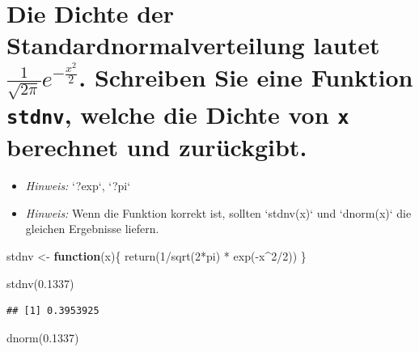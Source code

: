 \documentclass[12pt,a4paper]{article}
\newenvironment{Shaded}{\begin{snugshade}}{\end{snugshade}}
\newcommand{\ControlFlowTok}[1]{\textcolor[rgb]{0.13,0.29,0.53}{\textbf{#1}}}
\newcommand{\DecValTok}[1]{\textcolor[rgb]{0.00,0.00,0.81}{#1}}
\newcommand{\FloatTok}[1]{\textcolor[rgb]{0.00,0.00,0.81}{#1}}
\newcommand{\FunctionTok}[1]{\textcolor[rgb]{0.00,0.00,0.00}{#1}}
\newcommand{\NormalTok}[1]{#1}
\newcommand{\OtherTok}[1]{\textcolor[rgb]{0.56,0.35,0.01}{#1}}
\newcommand{\SpecialCharTok}[1]{\textcolor[rgb]{0.00,0.00,0.00}{#1}}
\begin{document}
\hypertarget{die-dichte-der-standardnormalverteilung-lautet-displaystyle-frac1sqrt2pi-e-fracx22.-schreiben-sie-eine-funktion-stdnv-welche-die-dichte-von-x-berechnet-und-zuruxfcckgibt.}{%
\section{\texorpdfstring{Die Dichte der Standardnormalverteilung lautet
\(\displaystyle \frac{1}{\sqrt{2\pi}} e^{-\frac{x^2}{2}}\). Schreiben
Sie eine Funktion \texttt{stdnv}, welche die Dichte von \texttt{x}
berechnet und
zurückgibt.}{Die Dichte der Standardnormalverteilung lautet \textbackslash displaystyle \textbackslash frac\{1\}\{\textbackslash sqrt\{2\textbackslash pi\}\} e\^{}\{-\textbackslash frac\{x\^{}2\}\{2\}\}. Schreiben Sie eine Funktion stdnv, welche die Dichte von x berechnet und zurückgibt.}}\label{die-dichte-der-standardnormalverteilung-lautet-displaystyle-frac1sqrt2pi-e-fracx22.-schreiben-sie-eine-funktion-stdnv-welche-die-dichte-von-x-berechnet-und-zuruxfcckgibt.}}

\begin{itemize}
  \item \textit{Hinweis:} `?exp`, `?pi`
  \item \textit{Hinweis:} Wenn die Funktion korrekt ist, sollten `stdnv(x)` und `dnorm(x)` die gleichen Ergebnisse liefern.
\end{itemize}

\begin{Shaded}
\begin{Highlighting}[]
\NormalTok{    stdnv }\OtherTok{\textless{}{-}} \ControlFlowTok{function}\NormalTok{(x)\{}
      \FunctionTok{return}\NormalTok{(}\DecValTok{1}\SpecialCharTok{/}\FunctionTok{sqrt}\NormalTok{(}\DecValTok{2}\SpecialCharTok{*}\NormalTok{pi) }\SpecialCharTok{*} \FunctionTok{exp}\NormalTok{(}\SpecialCharTok{{-}}\NormalTok{x}\SpecialCharTok{\^{}}\DecValTok{2}\SpecialCharTok{/}\DecValTok{2}\NormalTok{))}
\NormalTok{    \}}
    
    \FunctionTok{stdnv}\NormalTok{(}\FloatTok{0.1337}\NormalTok{)}
\end{Highlighting}
\end{Shaded}

\begin{verbatim}
## [1] 0.3953925
\end{verbatim}

\begin{Shaded}
\begin{Highlighting}[]
    \FunctionTok{dnorm}\NormalTok{(}\FloatTok{0.1337}\NormalTok{)}
\end{Highlighting}
\end{Shaded}
\end{document}
